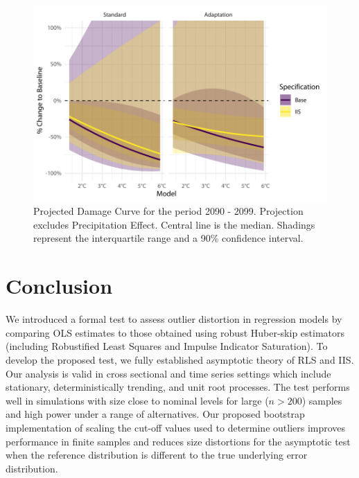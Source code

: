 \documentclass[11pt, letterpaper]{article}
\numberwithin{algorithm}{section}
\numberwithin{assumption}{section}
\numberwithin{lemma}{section}
\numberwithin{theorem}{section}
\numberwithin{corollary}{section}
\numberwithin{remark}{section}
\numberwithin{equation}{section}
\numberwithin{figure}{section}
\numberwithin{table}{section}
\newcommand{\ignore}[1]{}
\begin{document}
\ignore{Note: Can we show that our residuals produced by IIS are iid normal or at least satisfy either normal, homoscedasticity, or serially independent? Any one of these will help us to defend our paper if referees criticise on our assumptions. In addition, in this case we have a very well specified climate impact model that can pass all the specification tests.}


\begin{figure}[!htbp]  %
\centering
\includegraphics[width = \textwidth]{projections_noprcp_main.pdf}
\caption{Projected Damage Curve for the period 2090 - 2099. Projection excludes Precipitation Effect. Central line is the median. Shadings represent the interquartile range and a 90\% confidence interval.}
\label{fig_projection}
\end{figure}







\clearpage
\section{Conclusion}
We introduced a formal test to assess outlier distortion in regression models by comparing OLS estimates to those obtained using robust Huber-skip estimators (including Robustified Least Squares and Impulse Indicator Saturation). To develop the proposed test, we fully established asymptotic theory of RLS and IIS. Our analysis is valid in cross sectional and time series settings which include stationary, deterministically trending, and unit root processes. The test performs well in simulations with size close to nominal levels for large ($n>200$) samples and high power under a range of alternatives. Our proposed bootstrap implementation of scaling the cut-off values used to determine outliers improves performance in finite samples and reduces size distortions for the asymptotic test when the reference distribution is different to the true underlying error distribution.
\end{document}
